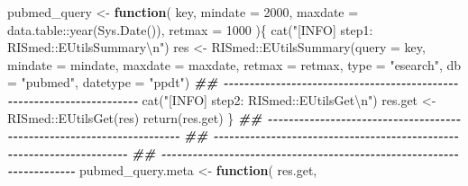 \documentclass[
]{article}
\newenvironment{Shaded}{\begin{snugshade}}{\end{snugshade}}
\newcommand{\AttributeTok}[1]{\textcolor[rgb]{0.77,0.63,0.00}{#1}}
\newcommand{\ControlFlowTok}[1]{\textcolor[rgb]{0.13,0.29,0.53}{\textbf{#1}}}
\newcommand{\DecValTok}[1]{\textcolor[rgb]{0.00,0.00,0.81}{#1}}
\newcommand{\DocumentationTok}[1]{\textcolor[rgb]{0.56,0.35,0.01}{\textbf{\textit{#1}}}}
\newcommand{\FunctionTok}[1]{\textcolor[rgb]{0.00,0.00,0.00}{#1}}
\newcommand{\NormalTok}[1]{#1}
\newcommand{\OtherTok}[1]{\textcolor[rgb]{0.56,0.35,0.01}{#1}}
\newcommand{\SpecialCharTok}[1]{\textcolor[rgb]{0.00,0.00,0.00}{#1}}
\newcommand{\StringTok}[1]{\textcolor[rgb]{0.31,0.60,0.02}{#1}}
\begin{document}
\begin{Shaded}
\begin{Highlighting}[]
\NormalTok{pubmed\_query }\OtherTok{\textless{}{-}} 
  \ControlFlowTok{function}\NormalTok{(}
\NormalTok{           key,}
           \AttributeTok{mindate =} \DecValTok{2000}\NormalTok{,}
           \AttributeTok{maxdate =}\NormalTok{ data.table}\SpecialCharTok{::}\FunctionTok{year}\NormalTok{(}\FunctionTok{Sys.Date}\NormalTok{()),}
           \AttributeTok{retmax =} \DecValTok{1000}
\NormalTok{           )\{}
    \FunctionTok{cat}\NormalTok{(}\StringTok{"[INFO] step1: RISmed::EUtilsSummary}\SpecialCharTok{\textbackslash{}n}\StringTok{"}\NormalTok{)}
\NormalTok{    res }\OtherTok{\textless{}{-}}\NormalTok{ RISmed}\SpecialCharTok{::}\FunctionTok{EUtilsSummary}\NormalTok{(}\AttributeTok{query =}\NormalTok{ key,}
                                 \AttributeTok{mindate =}\NormalTok{ mindate, }\AttributeTok{maxdate =}\NormalTok{ maxdate, }\AttributeTok{retmax =}\NormalTok{ retmax,}
                                 \AttributeTok{type =} \StringTok{"esearch"}\NormalTok{, }\AttributeTok{db =} \StringTok{"pubmed"}\NormalTok{, }\AttributeTok{datetype =} \StringTok{"ppdt"}\NormalTok{)}
    \DocumentationTok{\#\# {-}{-}{-}{-}{-}{-}{-}{-}{-}{-}{-}{-}{-}{-}{-}{-}{-}{-}{-}{-}{-}{-}{-}{-}{-}{-}{-}{-}{-}{-}{-}{-}{-}{-}{-}{-}{-}{-}{-}{-}{-}{-}{-}{-}{-}{-}{-}{-}{-}{-}{-}{-}{-}{-}{-}{-}{-}{-}{-}{-}{-}{-}{-}{-}{-}{-}{-}{-}{-}{-} }
    \FunctionTok{cat}\NormalTok{(}\StringTok{"[INFO] step2: RISmed::EUtilsGet}\SpecialCharTok{\textbackslash{}n}\StringTok{"}\NormalTok{)}
\NormalTok{    res.get }\OtherTok{\textless{}{-}}\NormalTok{ RISmed}\SpecialCharTok{::}\FunctionTok{EUtilsGet}\NormalTok{(res)}
    \FunctionTok{return}\NormalTok{(res.get)}
\NormalTok{  \}}
\DocumentationTok{\#\# {-}{-}{-}{-}{-}{-}{-}{-}{-}{-}{-}{-}{-}{-}{-}{-}{-}{-}{-}{-}{-}{-}{-}{-}{-}{-}{-}{-}{-}{-}{-}{-}{-}{-}{-}{-}{-}{-}{-}{-}{-}{-}{-}{-}{-}{-}{-}{-}{-}{-}{-}{-}{-}{-}{-}{-}{-}{-}{-}{-}{-}{-}{-}{-}{-}{-}{-}{-}{-}{-} }
\DocumentationTok{\#\# {-}{-}{-}{-}{-}{-}{-}{-}{-}{-}{-}{-}{-}{-}{-}{-}{-}{-}{-}{-}{-}{-}{-}{-}{-}{-}{-}{-}{-}{-}{-}{-}{-}{-}{-}{-}{-}{-}{-}{-}{-}{-}{-}{-}{-}{-}{-}{-}{-}{-}{-}{-}{-}{-}{-}{-}{-}{-}{-}{-}{-}{-}{-}{-}{-}{-}{-}{-}{-}{-} }
\DocumentationTok{\#\# {-}{-}{-}{-}{-}{-}{-}{-}{-}{-}{-}{-}{-}{-}{-}{-}{-}{-}{-}{-}{-}{-}{-}{-}{-}{-}{-}{-}{-}{-}{-}{-}{-}{-}{-}{-}{-}{-}{-}{-}{-}{-}{-}{-}{-}{-}{-}{-}{-}{-}{-}{-}{-}{-}{-}{-}{-}{-}{-}{-}{-}{-}{-}{-}{-}{-}{-}{-}{-}{-} }
\NormalTok{pubmed\_query.meta }\OtherTok{\textless{}{-}} 
  \ControlFlowTok{function}\NormalTok{(}
\NormalTok{           res.get,}

\end{Highlighting}
\end{Shaded}
\end{document}
